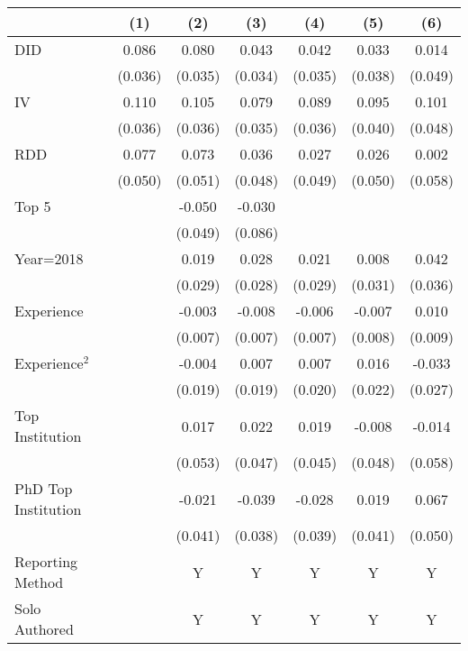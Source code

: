 \begin{tabular}{l*{6}{c}}
\hline\hline
                &\multicolumn{1}{c}{(1)}&\multicolumn{1}{c}{(2)}&\multicolumn{1}{c}{(3)}&\multicolumn{1}{c}{(4)}&\multicolumn{1}{c}{(5)}&\multicolumn{1}{c}{(6)}\\
\hline
DID             &    0.086&    0.080&    0.043&    0.042&    0.033&    0.014\\
                &  (0.036)&  (0.035)&  (0.034)&  (0.035)&  (0.038)&  (0.049)\\
IV              &    0.110&    0.105&    0.079&    0.089&    0.095&    0.101\\
                &  (0.036)&  (0.036)&  (0.035)&  (0.036)&  (0.040)&  (0.048)\\
RDD             &    0.077&    0.073&    0.036&    0.027&    0.026&    0.002\\
                &  (0.050)&  (0.051)&  (0.048)&  (0.049)&  (0.050)&  (0.058)\\
Top 5           &         &   -0.050&   -0.030&         &         &         \\
                &         &  (0.049)&  (0.086)&         &         &         \\
Year=2018       &         &    0.019&    0.028&    0.021&    0.008&    0.042\\
                &         &  (0.029)&  (0.028)&  (0.029)&  (0.031)&  (0.036)\\
Experience      &         &   -0.003&   -0.008&   -0.006&   -0.007&    0.010\\
                &         &  (0.007)&  (0.007)&  (0.007)&  (0.008)&  (0.009)\\
Experience$^2$  &         &   -0.004&    0.007&    0.007&    0.016&   -0.033\\
                &         &  (0.019)&  (0.019)&  (0.020)&  (0.022)&  (0.027)\\
Top Institution &         &    0.017&    0.022&    0.019&   -0.008&   -0.014\\
                &         &  (0.053)&  (0.047)&  (0.045)&  (0.048)&  (0.058)\\
PhD Top Institution&         &   -0.021&   -0.039&   -0.028&    0.019&    0.067\\
                &         &  (0.041)&  (0.038)&  (0.039)&  (0.041)&  (0.050)\\
Reporting Method &         &        Y&        Y&        Y&        Y&        Y\\
Solo Authored   &         &        Y&        Y&        Y&        Y&        Y\\

\end{tabular}
